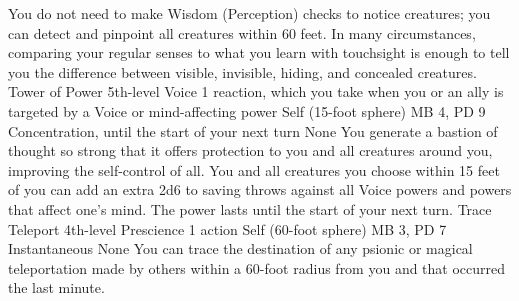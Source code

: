 You do not need to make Wisdom (Perception) checks to notice
creatures; you can detect and pinpoint all creatures within
60 feet. In many circumstances, comparing your regular senses
to what you learn with touchsight is enough to tell you the
difference between visible, invisible, hiding, and concealed
creatures.
\DndPowerHeader%
    {Tower of Power\label{pwr:tower_of_power}}
    {5th-level Voice}
    {1 reaction, which you take when you or an ally is targeted by a Voice or mind-affecting power}
    {Self (15-foot sphere)}
    {MB 4, PD 9}
    {Concentration, until the start of your next turn}
    {None}
You generate a bastion of thought so strong
that it offers protection to you and all creatures around
you, improving the self-control of all. You and all creatures
you choose within 15 feet of you can add an extra 2d6 to saving
throws against all Voice powers and powers that affect one's
mind. The power lasts until the start of your next turn.
\DndPowerHeader%
    {Trace Teleport\label{pwr:trace_teleport}}
    {4th-level Prescience}
    {1 action}
    {Self (60-foot sphere)}
    {MB 3, PD 7}
    {Instantaneous}
    {None}
You can trace the destination of any psionic or magical
teleportation made by others within a 60-foot radius from
you and that occurred the last minute.

